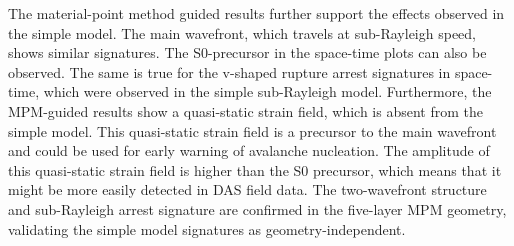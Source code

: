 The material-point method guided results further support the effects observed in the simple model. The main wavefront, which travels at sub-Rayleigh speed, shows similar signatures. The S0-precursor in the space-time plots can also be observed. The same is true for the v-shaped rupture arrest signatures in space-time, which were observed in the simple sub-Rayleigh model. Furthermore, the MPM-guided results show a quasi-static strain field, which is absent from the simple model. This quasi-static strain field is a precursor to the main wavefront and could be used for early warning of avalanche nucleation. The amplitude of this quasi-static strain field is higher than the S0 precursor, which means that it might be more easily detected in DAS field data. The two-wavefront structure and sub-Rayleigh arrest signature are confirmed in the five-layer MPM geometry, validating the simple model signatures as geometry-independent.\par

\cleardoublepage
